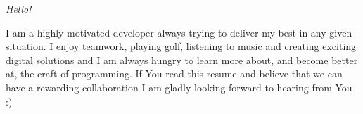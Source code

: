 {\itshape
Hello!

I am a highly motivated developer always trying to deliver my best in any given situation.
I enjoy teamwork, playing golf, listening to music and creating exciting digital solutions
and I am always hungry to learn more about, and become better at, the craft of programming.
If You read this resume and believe that we can have a rewarding collaboration I am gladly
looking forward to hearing from You :)}
